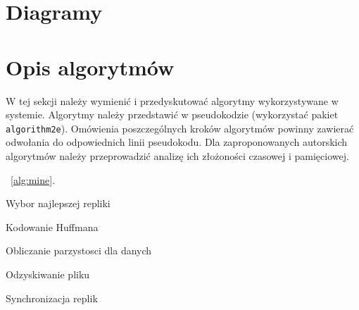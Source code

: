 \newpage





\section{Diagramy}

\section{Opis algorytmów}

W tej sekcji należy wymienić i przedyskutować algorytmy wykorzystywane w systemie. Algorytmy należy przedstawić w pseudokodzie (wykorzystać pakiet \texttt{algorithm2e}). Omówienia poszczególnych kroków algorytmów powinny zawierać odwołania do odpowiednich linii pseudokodu. Dla zaproponowanych autorskich algorytmów należy przeprowadzić analizę ich złożoności czasowej i pamięciowej. 

~\ref{alg:mine}.

{\small
\begin{pseudokod}[H]
\caption{Wybor najlepszej repliki}\label{alg:mine}
\end{pseudokod}
}

{\small
\begin{pseudokod}[H]
\caption{Kodowanie Huffmana}\label{alg:mine}
\end{pseudokod}
}

{\small
\begin{pseudokod}[H]
\caption{Obliczanie parzystosci dla danych}\label{alg:mine}
\end{pseudokod}
}

{\small
\begin{pseudokod}[H]
\caption{Odzyskiwanie pliku}\label{alg:mine}
\end{pseudokod}
}

{\small
\begin{pseudokod}[H]
\caption{Synchronizacja replik}\label{alg:mine}
\end{pseudokod}
}



